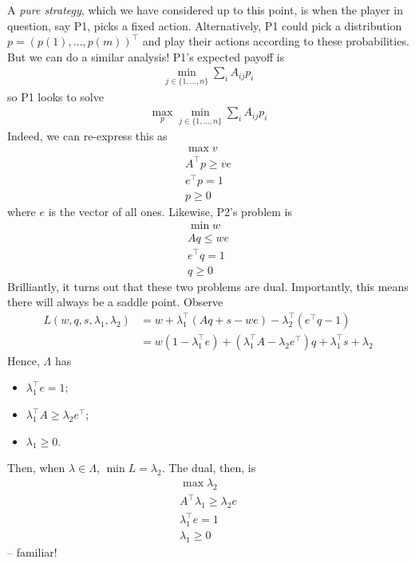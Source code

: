 \documentclass{../template/note}
\begin{document}
    A \emph{pure strategy}, which we have considered up to this point, is when the player in question, say P1, picks a fixed action. Alternatively, P1 could pick a distribution $p = (p(1), \dots, p(m))^\intercal$ and play their actions according to these probabilities. But we can do a similar analysis! P1's expected payoff is
    \begin{align*}
        \min_{j \in \{1, \dots, n\}} \sum_i A_{ij} p_i
    \end{align*}
    so P1 looks to solve
    \begin{align*}
        \max_p \min_{j \in \{1, \dots, n\}} \sum_i A_{ij} p_i
    \end{align*}
    Indeed, we can re-express this as
    \begin{align*}
        \max v \\
        A^\intercal p \geq ve \\
        e^\intercal p = 1 \\
        p \geq 0
    \end{align*}
    where $e$ is the vector of all ones. Likewise, P2's problem is
    \begin{align*}
        \min w \\
        Aq \leq we \\
        e^\intercal q = 1 \\
        q \geq 0
    \end{align*}
    Brilliantly, it turns out that these two problems are dual. Importantly, this means there will always be a saddle point. Observe
    \begin{align*}
        L(w, q, s, \lambda_1, \lambda_2) &= w + \lambda_1^\intercal (Aq+s-we) - \lambda_2^\intercal (e^\intercal q - 1) \\
        &= w(1-\lambda_1^\intercal e) + (\lambda_1^\intercal A - \lambda_2  e^\intercal) q + \lambda_1^\intercal s + \lambda_2
    \end{align*}
    Hence, $\Lambda$ has
    \begin{itemize}
        \item $\lambda_1^\intercal e = 1$;
        \item $\lambda_1^\intercal A \geq \lambda_2 e^\intercal$;
        \item $\lambda_1 \geq 0$.
    \end{itemize}
    Then, when $\lambda \in \Lambda$, $\min L = \lambda_2$. The dual, then, is
    \begin{align*}
        \max \lambda_2 \\
        A^\intercal \lambda_1 \geq \lambda_2e \\
        \lambda_1^\intercal e = 1 \\
        \lambda_1 \geq 0
    \end{align*}
    -- familiar!
\end{document}
